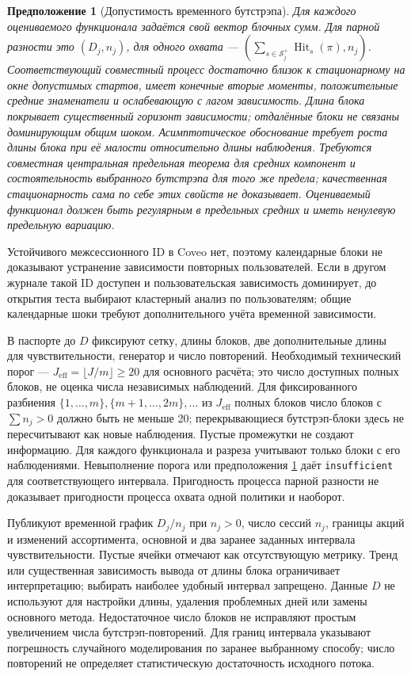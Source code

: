 \documentclass[12pt,a4paper]{article}
\newcommand{\code}[1]{{\ttfamily\small\nolinkurl{#1}}}
\theoremstyle{plainru}
\newtheorem{assumption}{Предположение}[section]
\begin{document}
\begin{assumption}[Допустимость временного бутстрэпа]
\label{ass:eval-block-dependence}
Для каждого оцениваемого функционала задаётся свой вектор блочных сумм.
Для парной разности это $(D_j,n_j)$, для одного охвата ---
$(\sum_{s\in\mathcal S_j^+}\operatorname{Hit}_s(\pi),n_j)$.
Соответствующий совместный процесс достаточно близок к стационарному
на окне допустимых стартов, имеет конечные вторые моменты,
положительные средние знаменатели и ослабевающую с лагом зависимость.
Длина блока покрывает существенный горизонт зависимости; отдалённые
блоки не связаны доминирующим общим шоком. Асимптотическое обоснование
требует роста длины блока при её малости относительно длины наблюдения.
Требуются совместная центральная предельная теорема для средних
компонент и состоятельность выбранного бутстрэпа для того же предела;
качественная стационарность сама по себе этих свойств не доказывает.
Оцениваемый функционал должен быть регулярным в предельных средних
и иметь ненулевую предельную вариацию.
\end{assumption}
Устойчивого межсессионного ID в Coveo нет, поэтому календарные блоки
не доказывают устранение зависимости повторных пользователей.
Если в другом журнале такой ID доступен и пользовательская зависимость
доминирует, до открытия теста выбирают кластерный анализ по пользователям;
общие календарные шоки требуют дополнительного учёта временной зависимости.

В паспорте до $D$ фиксируют сетку, длины блоков, две дополнительные
длины для чувствительности, генератор и число повторений.
Необходимый технический порог ---
$J_{\mathrm{eff}}=\lfloor J/m\rfloor\ge20$ для основного расчёта;
это число доступных полных блоков, не оценка числа независимых наблюдений.
Для фиксированного разбиения $\{1,\ldots,m\},\{m+1,\ldots,2m\},\ldots$
из $J_{\mathrm{eff}}$ полных блоков число блоков с $\sum n_j>0$
должно быть не меньше 20; перекрывающиеся бутстрэп-блоки здесь
не пересчитывают как новые наблюдения. Пустые промежутки не создают информацию.
Для каждого функционала и разреза учитывают только блоки с его
наблюдениями. Невыполнение порога или предположения
\ref{ass:eval-block-dependence} даёт \code{insufficient} для соответствующего
интервала. Пригодность процесса парной разности не доказывает
пригодности процесса охвата одной политики и наоборот.

Публикуют временной график $D_j/n_j$ при $n_j>0$, число сессий $n_j$,
границы акций и изменений ассортимента, основной и два заранее заданных
интервала чувствительности. Пустые ячейки отмечают как отсутствующую
метрику. Тренд или существенная зависимость вывода от длины блока
ограничивает интерпретацию; выбирать наиболее удобный интервал запрещено.
Данные $D$ не используют для настройки длины, удаления проблемных дней
или замены основного метода. Недостаточное число блоков не исправляют
простым увеличением числа бутстрэп-повторений.
Для границ интервала указывают погрешность случайного моделирования
по заранее выбранному способу; число повторений не определяет
статистическую достаточность исходного потока.
\end{document}
